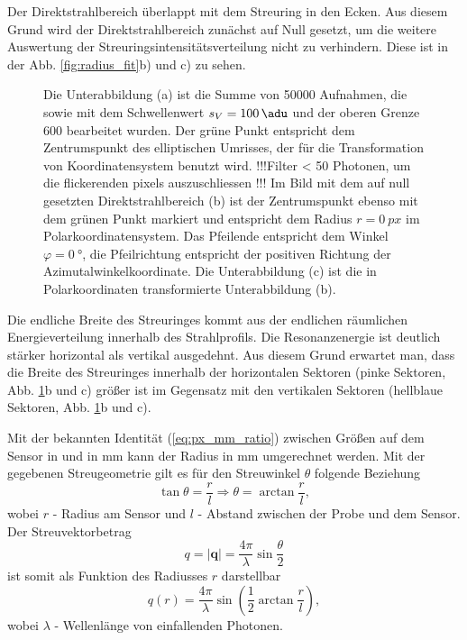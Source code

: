\noindent
Der Direktstrahlbereich überlappt mit dem Streuring in den Ecken. Aus diesem Grund wird der Direktstrahlbereich zunächst auf Null gesetzt, um die weitere Auswertung der Streuringsintensitätsverteilung nicht zu verhindern. Diese ist in der Abb. \ref{fig:radius_fit}b) und c) zu sehen.
\begin{figure}[H]
    \centering
    
    \caption{Die Unterabbildung (a) ist die Summe von \num{50000} Aufnahmen, die sowie mit dem Schwellenwert $s_V = \SI{100}{\adu}$ und der oberen Grenze \SI{600}{\adu} bearbeitet wurden. Der grüne Punkt entspricht dem Zentrumspunkt des elliptischen Umrisses, der für die Transformation von Koordinatensystem benutzt wird. !!!Filter < 50 Photonen, um die flickerenden pixels auszuschliessen !!! Im Bild mit dem auf null gesetzten Direktstrahlbereich (b) ist der Zentrumspunkt ebenso mit dem grünen Punkt markiert und entspricht dem Radius $r=\SI{0}{px}$ im Polarkoordinatensystem. Das Pfeilende entspricht dem Winkel $\varphi = \SI{0}{\degree}$, die Pfeilrichtung entspricht der positiven Richtung der Azimutalwinkelkoordinate. Die Unterabbildung (c) ist die in Polarkoordinaten transformierte Unterabbildung (b).}
    \label{fig:th-100-200-maske-radial-transform}
\end{figure}
\noindent
Die endliche Breite des Streuringes kommt aus der endlichen räumlichen Energieverteilung innerhalb des Strahlprofils. Die Resonanzenergie ist deutlich stärker horizontal als vertikal ausgedehnt. Aus diesem Grund erwartet man, dass die Breite des Streuringes innerhalb der horizontalen Sektoren (pinke Sektoren, Abb. \ref{fig:th-100-200-maske-radial-transform}b und c) größer ist im Gegensatz mit den vertikalen Sektoren (hellblaue Sektoren, Abb. \ref{fig:th-100-200-maske-radial-transform}b und c).

\noindent
Mit der bekannten Identität (\ref{eq:px_mm_ratio}) zwischen Größen auf dem Sensor in \si{\px} und in \si{\milli\meter} kann der Radius in \si{\milli\meter} umgerechnet werden. Mit der gegebenen Streugeometrie gilt es für den Streuwinkel $\theta$  folgende Beziehung
\begin{equation}
    \tan{\theta} = \frac{r}{l} \Rightarrow \theta = \arctan \frac{r}{l},
\end{equation}
wobei $r$ - Radius am Sensor und $l$ - Abstand zwischen der Probe und dem Sensor. Der Streuvektorbetrag 
\begin{equation}
    q = \left|\mathbf{q}\right| = \frac{4\pi}{\lambda}\sin{\frac{\theta}{2}}
\end{equation}
ist somit als Funktion des Radiusses $r$ darstellbar
\begin{equation}
    q(r) = \frac{4\pi}{\lambda}\sin\left(\frac{1}{2}\arctan\frac{r}{l}\right),
    \label{eq:streuvektor_von_radius}
\end{equation}
wobei $\lambda$ - Wellenlänge von einfallenden Photonen.

